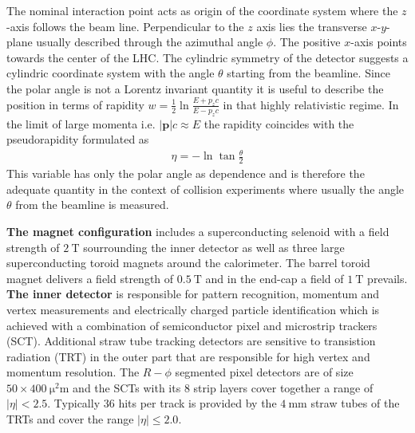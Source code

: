 %
The nominal interaction point acts as origin of the coordinate system where the $z$-axis follows the beam line. Perpendicular to the $z$ axis lies the transverse $x$-$y$-plane usually described through the azimuthal angle $\phi$. The positive $x$-axis points towards the center of the LHC. The cylindric symmetry of the detector suggests a cylindric coordinate system with the angle $\theta$ starting from the beamline. \cite{ATLASJINST} Since the polar angle is not a Lorentz invariant quantity it is useful to describe the position in terms of rapidity \cite{LHCJINST} $w=\frac12\ln{\frac{E+p_zc}{E-p_zc}}$ in that highly relativistic regime. In the limit of large momenta i.e. $|\mathbf{p}|c\approx E$ the rapidity coincides with the pseudorapidity formulated as \cite{ChinaPseudorapidityBook}
\begin{align}
                        \eta=-\ln{\tan\frac{\theta}{2}}
\label{pseudorapidity}
\end{align}
This variable has only the polar angle as dependence and is therefore the adequate quantity in the context of collision experiments where usually the angle $\theta$ from the beamline is measured. \cite{ChinaPseudorapidityBook}\par      
\textbf{The magnet configuration} includes a superconducting selenoid with a field strength of $\SI{2}{\tesla}$ sourrounding the inner detector as well as three large superconducting toroid magnets around the calorimeter. The barrel toroid magnet delivers a field strength of $\SI{0.5}{\tesla}$ and in the end-cap a field of $\SI{1}{\tesla}$ prevails. \cite{ATLASJINST}\newline%
\textbf{The inner detector} is responsible for pattern recognition, momentum and vertex measurements and electrically charged particle identification which is achieved with a combination of semiconductor pixel and microstrip trackers (SCT). Additional straw tube tracking detectors are sensitive to transistion radiation (TRT) in the outer part that are responsible for high vertex and momentum resolution. The $R-\phi$ segmented pixel detectors are of size $50\times \SI{400}{\square\micro\meter}$ and the SCTs with its $8$ strip layers cover together a range of $|\eta|<2.5$. Typically $36$ hits per track is provided by the $\SI{4}{\milli\meter}$ straw tubes of the TRTs and cover the range $|\eta|\leq 2.0$. \cite{ATLASJINST}\newline %
